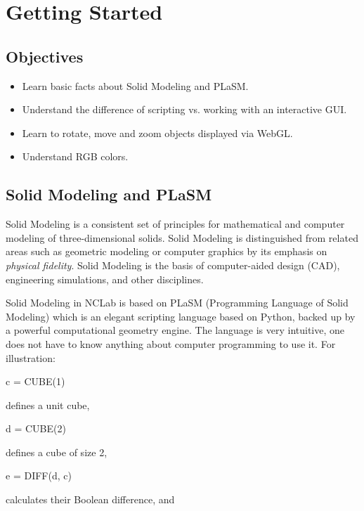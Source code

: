 
\pagestyle{plain}
\setcounter{page}{1}

\section{Getting Started}

\subsection{Objectives}
\begin{itemize}
\item Learn basic facts about Solid Modeling and PLaSM.
\item Understand the difference of scripting vs. working with an interactive GUI.
\item Learn to rotate, move and zoom objects displayed via WebGL.
\item Understand RGB colors.
\end{itemize}

\subsection{Solid Modeling and PLaSM}

Solid Modeling is a consistent set of principles for mathematical and computer 
modeling of three-dimensional solids. Solid Modeling is distinguished from related 
areas such as geometric modeling or computer graphics by its emphasis on {\em physical fidelity}.
Solid Modeling is the basis of computer-aided design (CAD), engineering simulations, and other disciplines.

Solid Modeling in NCLab is based on PLaSM (Programming Language 
of Solid Modeling) which is an elegant scripting language based on 
Python, backed up by a powerful computational geometry 
engine. The language is very intuitive, one does not have to know 
anything about computer programming to use it. For illustration:

\begin{bluecode}
c = CUBE(1)
\end{bluecode}
\noindent
defines a unit cube, 

\begin{bluecode}
d = CUBE(2)
\end{bluecode}
\noindent
defines a cube of size 2,

\begin{bluecode}
e = DIFF(d, c)
\end{bluecode}
calculates their Boolean difference, and

